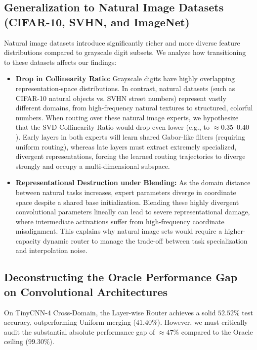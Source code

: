 \subsection{Generalization to Natural Image Datasets (CIFAR-10, SVHN, and ImageNet)}

Natural image datasets introduce significantly richer and more diverse feature distributions compared to grayscale digit subsets. We analyze how transitioning to these datasets affects our findings:
\begin{itemize}
    \item \textbf{Drop in Collinearity Ratio:} Grayscale digits have highly overlapping representation-space distributions. In contrast, natural datasets (such as CIFAR-10 natural objects vs. SVHN street numbers) represent vastly different domains, from high-frequency natural textures to structured, colorful numbers. When routing over these natural image experts, we hypothesize that the SVD Collinearity Ratio would drop even lower (e.g., to $\approx 0.35$--$0.40$). Early layers in both experts will learn shared Gabor-like filters (requiring uniform routing), whereas late layers must extract extremely specialized, divergent representations, forcing the learned routing trajectories to diverge strongly and occupy a multi-dimensional subspace.
    \item \textbf{Representational Destruction under Blending:} As the domain distance between natural tasks increases, expert parameters diverge in coordinate space despite a shared base initialization. Blending these highly divergent convolutional parameters lineally can lead to severe representational damage, where intermediate activations suffer from high-frequency coordinate misalignment. This explains why natural image sets would require a higher-capacity dynamic router to manage the trade-off between task specialization and interpolation noise.
\end{itemize}

\subsection{Deconstructing the Oracle Performance Gap on Convolutional Architectures}

On TinyCNN-4 Cross-Domain, the Layer-wise Router achieves a solid $52.52\%$ test accuracy, outperforming Uniform merging ($41.40\%$). However, we must critically audit the substantial absolute performance gap of $\approx 47\%$ compared to the Oracle ceiling ($99.30\%$).

